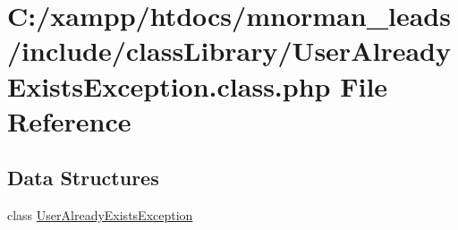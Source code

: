 \hypertarget{_user_already_exists_exception_8class_8php}{\section{C\-:/xampp/htdocs/mnorman\-\_\-leads/include/class\-Library/\-User\-Already\-Exists\-Exception.class.\-php File Reference}
\label{_user_already_exists_exception_8class_8php}
}
\subsection*{Data Structures}
\begin{DoxyCompactItemize}
\item 
class \hyperlink{class_user_already_exists_exception}{User\-Already\-Exists\-Exception}
\end{DoxyCompactItemize}

